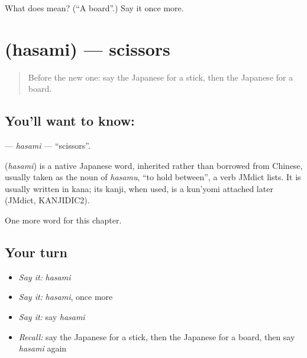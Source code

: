 \begin{tcolorbox}[breakable,colback=teal!4,colframe=teal!35!black,title={Before you move on}]
What does  mean? (\textquotedblleft{}A board\textquotedblright{}.) Say it once more.
\end{tcolorbox}
\section[\texorpdfstring{\ja{はさみ} (hasami)}{はさみ (hasami)}]{ (hasami) — scissors}

\label{lesson:JA-C100-hasami}



\begin{quote}
Before the new one: say the Japanese for a stick, then the Japanese for a board.
\end{quote}

\subsection*{You'll want to know: }
\textbf{} — \emph{hasami} — \textquotedblleft{}scissors\textquotedblright{}.

\begin{cousinweb}
\textbf{} (\emph{hasami}) is a native Japanese word, inherited rather than borrowed from Chinese, usually taken as the noun of \emph{hasamu}, \textquotedblleft{}to hold between\textquotedblright{}, a verb JMdict lists. It is usually written in kana; its kanji, when used, is a kun'yomi attached later (JMdict, KANJIDIC2).
\end{cousinweb}

\begin{grammarlens}[title={What you've built}]
One more word for this chapter.
\end{grammarlens}

\subsection*{Your turn}
\begin{itemize}
\raggedright
  \item \emph{Say it:} \emph{hasami}
  \item \emph{Say it:} \emph{hasami}, once more
  \item \emph{Say it:} say \emph{hasami}
  \item \emph{Recall:} say the Japanese for a stick, then the Japanese for a board, then say \emph{hasami} again
\end{itemize}


